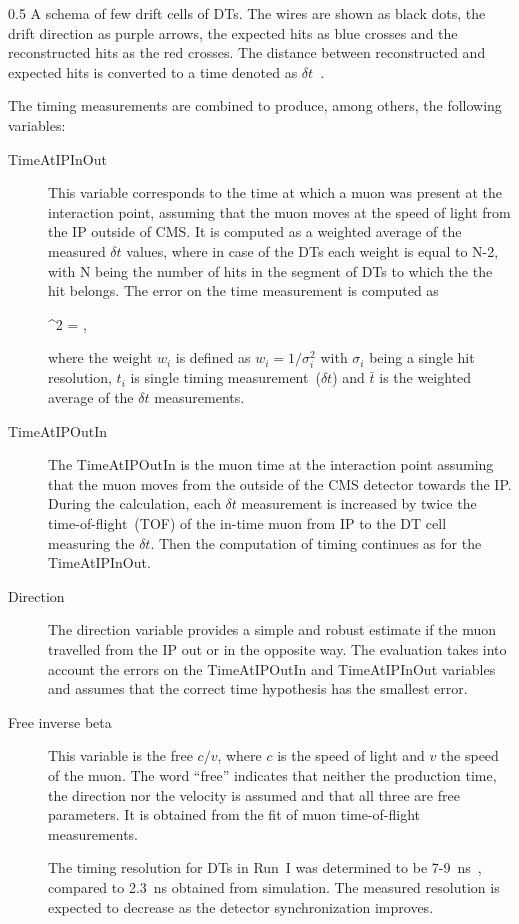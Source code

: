                  {0.5}       %
                 { A schema of few drift cells of DTs. The wires are shown as black dots, the drift direction as purple arrows, the expected hits as blue crosses and the reconstructed hits as the red crosses. The distance between reconstructed and expected hits is converted to a time denoted as $\delta t$~\cite{Traczyk:1365029}. }

The timing measurements are combined to produce, among others, the following variables: 

\begin{description}
\item [TimeAtIPInOut]
This variable corresponds to the time at which a muon was present at the interaction point, assuming that the muon moves at the speed of light from the IP outside of CMS. It is computed as a weighted average of the measured $\delta t$ values, where in case of the DTs each weight is equal to N-2, with N being the number of hits in the segment of DTs to which the the hit belongs. The error on the time measurement is computed as

{
 \sigma^{2} =  \times {} \times {},
}

where the weight $w_{i}$ is defined as $w_i = 1/\sigma_{i}^2$ with $\sigma_{i}$ being a single hit resolution, $t_{i}$ is single timing measurement~($\delta t$) and $\bar{t}$ is the weighted average of the $\delta t$ measurements.

\item[TimeAtIPOutIn]
The TimeAtIPOutIn is the muon time at the interaction point assuming that the muon moves from the outside of the CMS detector towards the IP. During the calculation, each $\delta t$ measurement is increased by twice the time-of-flight~(TOF) of the in-time muon from IP to the DT cell measuring the $\delta t$. Then the computation of timing continues as for the TimeAtIPInOut.

\item[Direction]
The direction variable provides a simple and robust estimate if the muon travelled from the IP out or in the opposite way. The evaluation takes into account the errors on the TimeAtIPOutIn and TimeAtIPInOut variables and assumes that the correct time hypothesis has the smallest error.

\item[Free inverse beta]
This variable is the free $c/v$, where $c$ is the speed of light and $v$ the speed of the muon. The word ``free'' indicates that neither the production time, the direction nor the velocity is assumed and that all three are free parameters. It is obtained from the fit of muon time-of-flight measurements.

The timing resolution for DTs in Run~I was determined to be 7-9~ns~\cite{Traczyk:1365029}, compared to 2.3~ns obtained from simulation. The measured resolution is expected to decrease as the detector synchronization improves.

\end{description}
